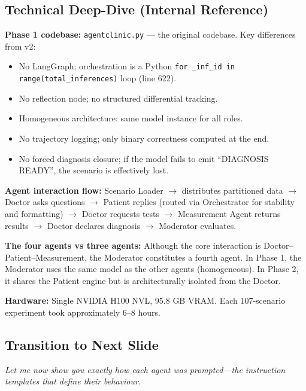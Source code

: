 \documentclass[12pt]{article}
\begin{document}
  \subsection*{Technical Deep-Dive (Internal Reference)}
  {\color{techgray}
  \textbf{Phase 1 codebase:} \texttt{agentclinic.py} --- the original codebase. Key differences from v2:
  \begin{itemize}
    \item No LangGraph; orchestration is a Python \texttt{for \_inf\_id in range(total\_inferences)} loop (line 622).
    \item No reflection node; no structured differential tracking.
    \item Homogeneous architecture: same model instance for all roles.
    \item No trajectory logging; only binary correctness computed at the end.
    \item No forced diagnosis closure; if the model fails to emit ``DIAGNOSIS READY'', the scenario is effectively lost.
  \end{itemize}

  \textbf{Agent interaction flow:} Scenario Loader $\to$ distributes partitioned data $\to$ Doctor asks questions $\to$ Patient replies (routed via Orchestrator for stability and formatting) $\to$ Doctor requests tests $\to$ Measurement Agent returns results $\to$ Doctor declares diagnosis $\to$ Moderator evaluates.

  \textbf{The four agents vs three agents:} Although the core interaction is Doctor--Patient--Measurement, the Moderator constitutes a fourth agent. In Phase 1, the Moderator uses the same model as the other agents (homogeneous). In Phase 2, it shares the Patient engine but is architecturally isolated from the Doctor.

  \textbf{Hardware:} Single NVIDIA H100 NVL, 95.8 GB VRAM. Each 107-scenario experiment took approximately 6--8 hours.
  }

  \subsection*{Transition to Next Slide}
  {\color{transgreen}
  \textit{Let me now show you exactly how each agent was prompted---the instruction templates that define their behaviour.}
  }
\end{document}
